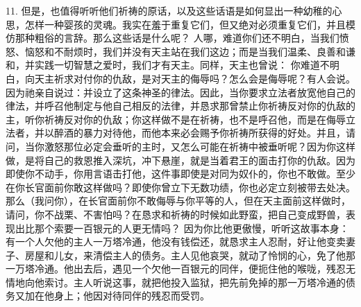 11. 但是，也值得听听他们祈祷的原话，以及这些话语是如何显出一种幼稚的心思，怎样一种婴孩的灵魂。我实在羞于重复它们，但又绝对必须重复它们，并且模仿那种粗俗的言辞。那么这些话是什么呢？ 人哪，难道你们还不明白，当我们愤怒、恼怒和不耐烦时，我们并没有天主站在我们这边；而是当我们温柔、良善和谦和，并实践一切智慧之爱时，我们才有天主。同样，天主也曾说： 你难道不明白，向天主祈求对付你的仇敌，是对天主的侮辱吗？怎么会是侮辱呢？有人会说。因为祂亲自说过：并设立了这条神圣的律法。因此，当你要求立法者放宽他自己的律法，并呼召他制定与他自己相反的法律，并恳求那曾禁止你祈祷反对你的仇敌的主，听你祈祷反对你的仇敌；你这样做不是在祈祷，也不是呼召他，而是在侮辱立法者，并以醉酒的暴力对待他，而他本来必会赐予你祈祷所获得的好处。并且，请问，当你激怒那位必定会垂听的主时，又怎么可能在祈祷中被垂听呢？因为你这样做，是将自己的救恩推入深坑，冲下悬崖，就是当着君王的面击打你的仇敌。因为即使你不动手，你用言语击打他，这件事即使是对同为奴仆的，你也不敢做。至少在你长官面前你敢这样做吗？即使你曾立下无数功绩，你也必定立刻被带去处决。那么（我问你），在长官面前你不敢侮辱与你平等的人，但在天主面前这样做时，请问，你不战栗、不害怕吗？在恳求和祈祷的时候如此野蛮，把自己变成野兽，表现出比那个索要一百银元的人更无情吗？ 因为你比他更傲慢，听听这故事本身：有一个人欠他的主人一万塔冷通，他没有钱偿还，就恳求主人忍耐，好让他变卖妻子、房屋和儿女，来清偿主人的债务。主人见他哀哭，就动了怜悯的心，免了他那一万塔冷通。他出去后，遇见一个欠他一百银元的同伴，便扼住他的喉咙，残忍无情地向他索讨。主人听说这事，就把他投入监狱，把先前免掉的那一万塔冷通的债务又加在他身上；他因对待同伴的残忍而受罚。\par

